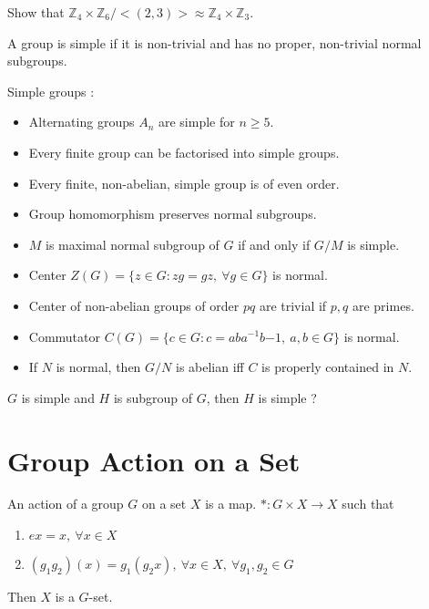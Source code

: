 \begin{question}
	Show that $\mathbb{Z}_4 \times \mathbb{Z}_6 / <(2,3)> \approx \mathbb{Z}_4 \times \mathbb{Z}_3$.
\end{question}

\begin{definition}
	A group is simple if it is non-trivial and has no proper, non-trivial normal subgroups.
\end{definition}

\begin{remark} Simple groups :
	\begin{itemize}
		\item Alternating groups $A_n$ are simple for $n \ge 5$.%
		\item Every finite group can be factorised into simple groups.%
		\item Every finite, non-abelian, simple group is of even order.%
		\item Group homomorphism preserves normal subgroups.%
		\item $M$ is maximal normal subgroup of $G$ if and only if $G/M$ is simple.%
		\item Center $Z(G) = \{ z \in G : zg = gz,\ \forall g \in G \}$ is normal.%
		\item Center of non-abelian groups of order $pq$ are trivial if $p,q$ are primes.%
		\item Commutator $C(G) = \{ c \in G : c = aba^{-1}b{-1},\ a,b \in G \}$ is normal.%
		\item If $N$ is normal, then $G/N$ is abelian iff $C$ is properly contained in $N$.%
	\end{itemize}
\end{remark}

\begin{question}
	$G$ is simple and $H$ is subgroup of $G$, then $H$ is simple ?
\end{question}


\section{Group Action on a Set}
\begin{definition}%
	An action of a group $G$ on a set $X$ is a map.
	$\ast : G \times X \to X$ such that
	\begin{enumerate}
		\item $ex = x,\ \forall x \in X$
		\item $(g_1g_2)(x) = g_1(g_2x),\ \forall x \in X,\ \forall g_1,g_2 \in G$
	\end{enumerate}
	Then $X$ is a $G$-set.
\end{definition}

